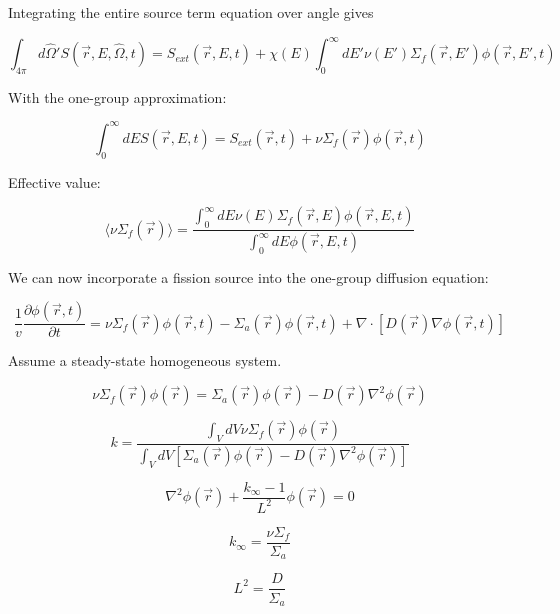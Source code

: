 \documentclass[12pt]{article}
\newcommand{\rvec}{\ensuremath{\vec{r}}}
\newcommand{\omvec}{\ensuremath{\hat{\Omega}}}
\begin{document}
Integrating the entire source term equation over angle gives

\begin{equation*}
\int_{4\pi}d\omvec'S(\rvec,E,\omvec,t) = S_{ext}(\rvec,E,t) + 
\chi(E)\int_0^{\infty}dE'\nu(E')\Sigma_f(\rvec,E')\phi(\rvec,E',t)
\end{equation*}

With the one-group approximation:

\begin{equation*}
\int_{0}^{\infty}dE S(\rvec,E,t) = S_{ext}(\rvec,t) + 
\nu\Sigma_f(\rvec)\phi(\rvec,t)
\end{equation*}

Effective value:

\begin{equation*}
\langle\nu\Sigma_f(\rvec)\rangle = 
\frac{\int_{0}^{\infty}dE\nu(E)\Sigma_f(\rvec,E)\phi(\rvec,E,t)}{\int_{0}^{\infty}dE\phi(\rvec,E,t)}
\end{equation*}

We can now incorporate a fission source into the one-group diffusion equation:

\begin{equation*}
\frac{1}{v}\frac{\partial\phi(\rvec,t)}{\partial t} = \nu\Sigma_f(\rvec)\phi(\rvec,t) - 
\Sigma_a(\rvec)\phi(\rvec,t) + \nabla\cdot[D(\rvec)\nabla\phi(\rvec,t)]
\end{equation*}

Assume a steady-state homogeneous system.

\begin{equation*}
\nu\Sigma_f(\rvec)\phi(\rvec) = 
\Sigma_a(\rvec)\phi(\rvec) - D(\rvec)\nabla^2\phi(\rvec)
\end{equation*}

\begin{equation*}
k = \frac{\int_V dV\nu\Sigma_f(\rvec)\phi(\rvec)}{\int_V dV[\Sigma_a(\rvec)\phi(\rvec) - D(\rvec)\nabla^2\phi(\rvec)]}
\end{equation*}

\begin{equation*}
\nabla^2\phi(\rvec) + \frac{k_{\infty} - 1}{L^2}\phi(\rvec) = 0
\end{equation*}

\begin{equation*}
k_{\infty} = \frac{\nu\Sigma_f}{\Sigma_a}
\end{equation*}

\begin{equation*}
L^2 = \frac{D}{\Sigma_a}
\end{equation*}
\end{document}
